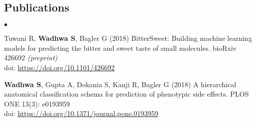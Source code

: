 \documentclass[margin,line]{res}
\newenvironment{list2}{
  \begin{list}{$\bullet$}{%
      \setlength{\itemsep}{0in}
      \setlength{\parsep}{0in} \setlength{\parskip}{0in}
      \setlength{\topsep}{0in} \setlength{\partopsep}{0in}
      \setlength{\leftmargin}{0.2in}}}{\end{list}}
\begin{document}
\begin{resume}
\section{\sc Publications}
\begin{list2}
\item Tuwani R, {\bf Wadhwa S}, Bagler G (2018) BitterSweet: Building machine learning models for predicting the bitter and sweet taste of small molecules. bioRxiv 426692 \textit{(preprint)}
\\doi: {\href{https://doi.org/10.1101/426692}{https://doi.org/10.1101/426692}}
\item {\bf Wadhwa S}, Gupta A, Dokania S, Kanji R, Bagler G (2018) A hierarchical anatomical classification schema for prediction of phenotypic side effects. PLOS ONE 13(3): e0193959
\\doi: {\href{https://doi.org/10.1371/journal.pone.0193959}{https://doi.org/10.1371/journal.pone.0193959}}
\end{list2}


\end{resume}
\end{document}
